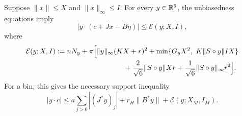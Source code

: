 \begin{lemma}
\label{exclude:weighted-single}
Suppose $\|x\|\le X$ and $\|x\|_\infty\le I$.
For every $y\in\mathbb R^6$, the unbiasedness equations imply
\begin{equation}
 \bigl|y\cdot(c+Jx-B\eta)\bigr|\le\mathcal E(y;X,I),
 \label{exclude:weighted-residual}
\end{equation}
where
\begin{align}
 \mathcal E(y;X,I):={}&nN_y+\pi\Bigl[
   \|y\|_\infty(KX+r)^2
   +\min\{G_yX^2,\ K\|S\circ y\|IX\}\notag\\
 &\hspace{28mm}
   +\frac{2}{\sqrt6}\|S\circ y\|Xr
   +\frac1{\sqrt6}\|S\circ y\|_\infty r^2\Bigr].
 \label{exclude:weighted-error}
\end{align}
For a bin, this gives the necessary support inequality
\begin{equation}
 |y\cdot c|
 \le a\sum_{j>0}|(J^*y)_j|+r_H\|B^*y\|
       +\mathcal E(y;X_M,I_M).
 \label{exclude:bin-support}
\end{equation}
\end{lemma}
